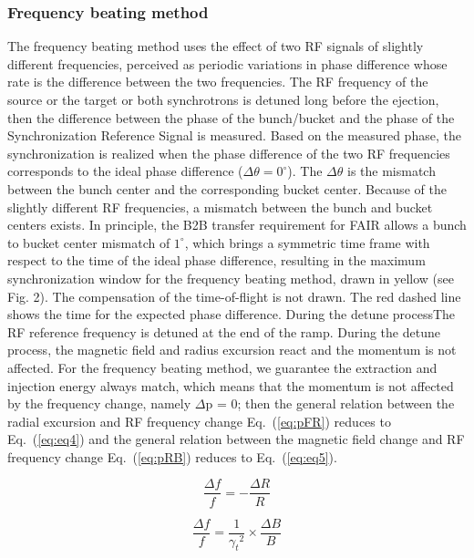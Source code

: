 \subsubsection{Frequency beating method}
The frequency beating method uses the effect of two RF signals of slightly different frequencies, perceived as periodic variations in phase difference whose rate is the difference between the two frequencies. The RF frequency of the source or the target or both synchrotrons is detuned long before the ejection, then the difference between the phase of the bunch/bucket and the phase of the Synchronization Reference Signal is measured. Based on the measured phase, the synchronization is realized when the phase difference of the two RF frequencies corresponds to the ideal phase difference ($\Delta \theta = 0^\circ$). The $\Delta \theta$ is the mismatch between the bunch center and the corresponding bucket center. Because of the slightly different RF frequencies, a mismatch between the bunch and bucket centers exists. In principle, the B2B transfer requirement for FAIR allows a bunch to bucket center mismatch of $1^\circ$, which brings a symmetric time frame with respect to the time
of the ideal phase difference, resulting in the maximum synchronization window for the frequency beating method, drawn in yellow (see Fig. 2). The compensation of the time-of-flight is not drawn. The red dashed line shows the time for the expected phase difference.
During the detune processThe RF reference frequency is detuned at the end of the ramp. During the detune process, the magnetic field and radius excursion react and the momentum is not affected.
For the frequency beating method, we guarantee the extraction and injection energy always match, which means that the momentum is not affected by the frequency change, namely $\Delta$p = 0; then the general relation between the radial excursion and RF frequency change Eq.~(\ref{eq:pFR}) reduces to Eq.~(\ref{eq:eq4}) and the general relation between the magnetic field change and RF frequency change Eq.~(\ref{eq:pRB}) reduces to Eq.~(\ref{eq:eq5}).

\begin{equation}
\frac{\Delta{f}}{f} = - \frac{\Delta{R}}{R}
\label{eq:eq4}
\end{equation}

\begin{equation}
\frac{\Delta{f}}{f} =  \frac{1}{{\gamma_t}^2}\times{\frac{\Delta{B}}{B}}
\label{eq:eq5}
\end{equation}

